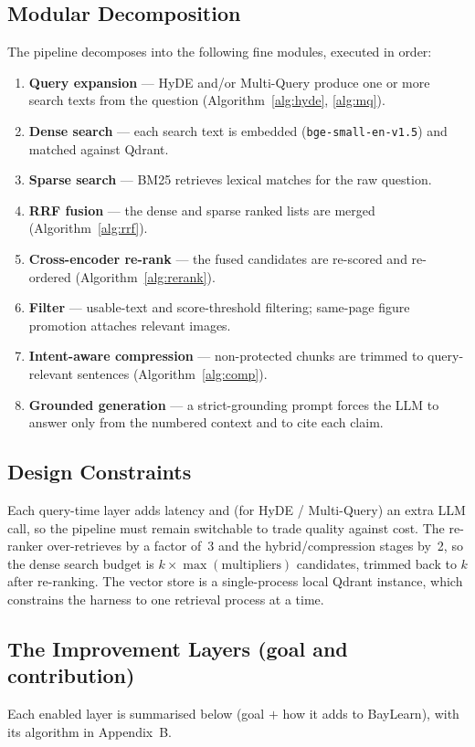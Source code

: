 \documentclass[12pt,a4paper]{report}
\begin{document}
\subsection{Modular Decomposition}
The pipeline decomposes into the following fine modules, executed in order:
\begin{enumerate}[nosep]
  \item \textbf{Query expansion} --- HyDE and/or Multi-Query produce one or more
        search texts from the question (Algorithm~\ref{alg:hyde},
        \ref{alg:mq}).
  \item \textbf{Dense search} --- each search text is embedded
        (\texttt{bge-small-en-v1.5}) and matched against Qdrant.
  \item \textbf{Sparse search} --- BM25 retrieves lexical matches for the raw
        question.
  \item \textbf{RRF fusion} --- the dense and sparse ranked lists are merged
        (Algorithm~\ref{alg:rrf}).
  \item \textbf{Cross-encoder re-rank} --- the fused candidates are re-scored and
        re-ordered (Algorithm~\ref{alg:rerank}).
  \item \textbf{Filter} --- usable-text and score-threshold filtering; same-page
        figure promotion attaches relevant images.
  \item \textbf{Intent-aware compression} --- non-protected chunks are trimmed to
        query-relevant sentences (Algorithm~\ref{alg:comp}).
  \item \textbf{Grounded generation} --- a strict-grounding prompt forces the LLM
        to answer only from the numbered context and to cite each claim.
\end{enumerate}

\subsection{Design Constraints}
Each query-time layer adds latency and (for HyDE / Multi-Query) an extra LLM call,
so the pipeline must remain switchable to trade quality against cost. The
re-ranker over-retrieves by a factor of~3 and the hybrid/compression stages by~2,
so the dense search budget is $k\times\max(\text{multipliers})$ candidates,
trimmed back to $k$ after re-ranking. The vector store is a single-process local
Qdrant instance, which constrains the harness to one retrieval process at a time.

\subsection{The Improvement Layers (goal and contribution)}
Each enabled layer is summarised below (goal $+$ how it adds to BayLearn), with
its algorithm in Appendix~B.
\end{document}
